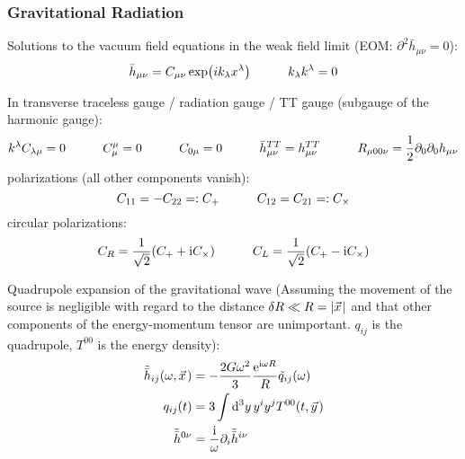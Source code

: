 		\subsubsection{Gravitational Radiation}
			Solutions to the vacuum field equations in the weak field limit (EOM: $\partial^2 \bar{h}_{\mu\nu} = 0$):
			\begin{equation}
				\bar{h}_{\mu\nu} = C_{\mu\nu} \exp(i k_\lambda x^\lambda) \hspace{30pt} k_\lambda k^\lambda = 0
			\end{equation}

			\noindent
			In transverse traceless gauge / radiation gauge / TT gauge (subgauge of the harmonic gauge):
			\begin{equation}
				\begin{aligned}
					k^\lambda C_{\lambda\mu} &= 0
					\hspace{30pt} C^\mu_\mu = 0
					\hspace{30pt} C_{0\mu} = 0
					\hspace{30pt} \bar{h}_{\mu\nu}^{TT} = {h}_{\mu\nu}^{TT}
					\hspace{30pt} R_{\mu 0 0 \nu} = \frac{1}{2} \partial_0 \partial_0 h_{\mu\nu} \\
				\end{aligned}
			\end{equation}
			polarizations (all other components vanish):
			\begin{equation}
				C_{11} = -C_{22} =: C_+
				\hspace{30pt} C_{12} = C_{21} =: C_\times
			\end{equation}
			circular polarizations:
			\begin{equation}
				C_R = \frac{1}{\sqrt{2}} (C_+ + \mathrm{i} C_\times)
				\hspace{30pt} C_L = \frac{1}{\sqrt{2}} (C_+ - \mathrm{i} C_\times)
			\end{equation}

			\noindent
			Quadrupole expansion of the gravitational wave (Assuming the movement of the source is negligible with regard to the distance $\delta R \ll R=\abs{\vec{x}}$ and that other components of the energy-momentum tensor are unimportant. $q_{ij}$ is the quadrupole, $T^{00}$ is the energy density):
			\begin{equation}
				\begin{aligned}
					\tilde{\bar{h}}_{ij}(\omega,\vec{x}) &= -\frac{2G\omega^2}{3}\frac{\ex^{\i\omega R}}{R} \tilde{q}_{ij}(\omega) \\
					q_{ij}(t) &= 3\int \dd[3]{y} y^i y^j T^{00}(t,\vec{y}) \\
					\tilde{\bar{h}}^{0\nu} &= \frac{\i}{\omega}\partial_i \tilde{\bar{h}}^{i\nu}
				\end{aligned}
			\end{equation}


